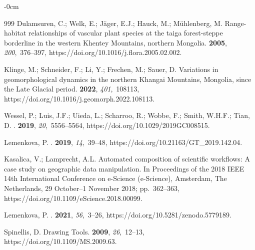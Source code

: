 \documentclass[geosciences,article,accept,pdftex,oneauthor]{Definitions/mdpi}
\begin{document}
\begin{adjustwidth}{-\extralength}{0cm}
\begin{thebibliography}{999}
Dulamsuren, C.; Welk, E.; Jäger, E.J.; Hauck, M.; Mühlenberg, M.
\newblock Range-habitat relationships of vascular plant species at the taiga
  forest-steppe borderline in the western Khentey Mountains, northern Mongolia.
  {\bf 2005}, {\em 200},~376--397, https://doi.org/10.1016/j.flora.2005.02.002.

Klinge, M.; Schneider, F.; Li, Y.; Frechen, M.; Sauer, D.
\newblock Variations in geomorphological dynamics in the northern Khangai
  Mountains, Mongolia, since the Late Glacial period.
 {\bf 2022}, {\em 401},~108113, https://doi.org/10.1016/j.geomorph.2022.108113.

Wessel, P.; Luis, J.F.; Uieda, L.; Scharroo, R.; Wobbe, F.; Smith, W.H.F.;
  Tian, D.
.
 {\bf 2019}, {\em
  20},~5556--5564, https://doi.org/10.1029/2019GC008515.

Lemenkova, P.
.
 {\bf 2019}, {\em 14},~39--48, https://doi.org/10.21163/GT\_2019.142.04.

Kasalica, V.; Lamprecht, A.L.
\newblock Automated composition of scientific workflows: A case study on
  geographic data manipulation.
\newblock In Proceedings of the 2018 IEEE 14th International Conference on
  e-Science (e-Science), Amsterdam, The Netherlands,  29 October--1 November 2018; pp.~362--363, https://doi.org/10.1109/eScience.2018.00099.

Lemenkova, P.
.
 {\bf 2021}, {\em 56},~3--26, https://doi.org/10.5281/zenodo.5779189.

Spinellis, D.
\newblock Drawing Tools.
 {\bf 2009}, {\em 26},~12--13, https://doi.org/10.1109/MS.2009.63.


\end{thebibliography}
\end{adjustwidth}
\end{document}
